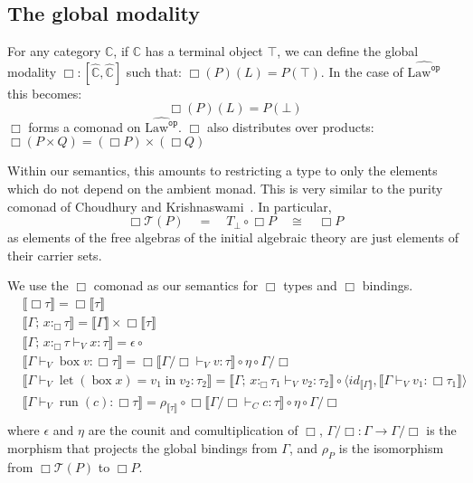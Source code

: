 \documentclass[acmsmall, screen, review, anonymous]{acmart}
\theoremstyle{definition}
\newcommand{\glob}{\mathop{\Box}}
\newcommand{\cat}{\mathbb{C}}
\newcommand{\psh}{\widehat{\cat}}
\newcommand{\terminal}{\top}
\newcommand{\initial}{\bot}
\newcommand{\lawc}{\mathrm{Law}}
\newcommand{\lawcop}{\lawc^{\mathtt{op}}}
\newcommand{\pshlawcop}{\widehat{\lawcop}}
\newcommand{\sem}[1]{\llbracket #1 \rrbracket}
\newcommand{\mon}{\mathcal{T}}
\newcommand{\snd}{\mathop{\pi_2}}
\newcommand{\types}{\mathrel{:}}
\newcommand{\gtypes}{\mathrel{:_{\Box}}}
\newcommand{\ccons}[2]{#1;\,#2}
\newcommand{\gbind}[3]{\ccons{#1}{#2\gtypes#3}}
\newcommand{\cdiv}[1]{#1/\Box}
\newcommand{\gbox}[1]{\mathop{\mathrm{box}} #1}
\newcommand{\gunbox}[3]{\mathop{\mathrm{let}} (\gbox #1) = #2 \mathop{\mathrm{in}} #3}
\newcommand{\grun}[1]{\mathop{\mathrm{run}}(#1)}
\newcommand{\turnv}{\mathrel{\vdash_V}}
\newcommand{\turnc}{\mathrel{\vdash_C}}
\begin{document}
\subsection{The global modality}

For any category $\cat$, if $\cat$ has a terminal object $\terminal$, we
can define the global modality $\glob \types [\psh, \psh]$ such that:
$\glob(P)(L) = P(\terminal)$. In the case of $\pshlawcop$ this becomes:
\begin{equation*}
\glob(P)(L) = P(\initial)
\end{equation*}
$\glob$ forms a comonad on $\pshlawcop$. $\glob$ also distributes over
products: $\glob (P \times Q) = (\glob P) \times (\glob Q)$

Within our semantics, this amounts to restricting a type to only the
elements which do not depend on the ambient monad. This is very similar
to the purity comonad of Choudhury and
Krishnaswami~\cite{choudhury2020recovering}. In particular,
\begin{equation*}
  \glob \mon(P) \quad = \quad T_{\initial} \circ \glob P
  \quad \cong \quad \glob P
\end{equation*}
as elements of the free algebras of the initial algebraic theory are
just elements of their carrier sets.

We use the $\glob$ comonad as our semantics for $\glob$ types and
$\glob$ bindings.
\begin{align*}
&\sem{\glob \tau} = \glob \sem{\tau} \\
&\sem{\gbind{\Gamma}{x}{\tau}} = \sem{\Gamma} \times \glob \sem{\tau} \\
&\sem{\gbind{\Gamma}{x}{\tau} \turnv x \types \tau} = \epsilon \circ \snd \\
&\sem{\Gamma \turnv \gbox{v} \types \glob \tau} =
  \glob \sem{\cdiv{\Gamma} \turnv v \types \tau}
  \circ \eta \circ \cdiv{\Gamma} \\
&\sem{\Gamma \turnv \gunbox{x}{v_1}{v_2} \types \tau_2} =
  \sem{\gbind{\Gamma}{x}{\tau_1} \turnv v_2 \types \tau_2}
  \circ \langle id_{\sem{\Gamma}},
                \sem{\Gamma \turnv v_1 \types \glob \tau_1} \rangle \\
&\sem{\Gamma \turnv \grun{c} \types \glob \tau} =
  \rho_{\sem{\tau}}
  \circ \glob \sem{\cdiv{\Gamma} \turnc c \types \tau}
  \circ \eta \circ \cdiv{\Gamma}\\
\end{align*}
where $\epsilon$ and $\eta$ are the counit and comultiplication of
$\glob$, $\cdiv{\Gamma} \types \Gamma \rightarrow \cdiv{\Gamma}$ is the
morphism that projects the global bindings from $\Gamma$, and $\rho_P$
is the isomorphism from $\glob \mon(P)$ to $\glob P$.
\end{document}
